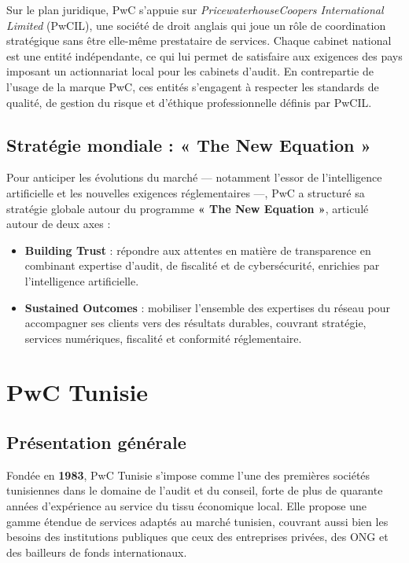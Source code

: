 Sur le plan juridique, PwC s'appuie sur \textit{PricewaterhouseCoopers International
Limited} (PwCIL), une société de droit anglais qui joue un rôle de coordination
stratégique sans être elle-même prestataire de services. Chaque cabinet national est
une entité indépendante, ce qui lui permet de satisfaire aux exigences des pays imposant
un actionnariat local pour les cabinets d'audit. En contrepartie de l'usage de la marque
PwC, ces entités s'engagent à respecter les standards de qualité, de gestion du risque
et d'éthique professionnelle définis par PwCIL.

\subsection{Stratégie mondiale : « The New Equation »}

Pour anticiper les évolutions du marché --- notamment l'essor de l'intelligence
artificielle et les nouvelles exigences réglementaires ---, PwC a structuré sa stratégie
globale autour du programme \textbf{« The New Equation »}, articulé autour de deux axes :

\begin{itemize}
  \item \textbf{Building Trust} : répondre aux attentes en matière de transparence en
    combinant expertise d'audit, de fiscalité et de cybersécurité, enrichies par
    l'intelligence artificielle.
  \item \textbf{Sustained Outcomes} : mobiliser l'ensemble des expertises du réseau pour
    accompagner ses clients vers des résultats durables, couvrant stratégie, services
    numériques, fiscalité et conformité réglementaire.
\end{itemize}

\section{PwC Tunisie}

\subsection{Présentation générale}

Fondée en \textbf{1983}, PwC Tunisie s'impose comme l'une des premières sociétés
tunisiennes dans le domaine de l'audit et du conseil, forte de plus de quarante années
d'expérience au service du tissu économique local. Elle propose une gamme étendue de
services adaptés au marché tunisien, couvrant aussi bien les besoins des institutions
publiques que ceux des entreprises privées, des ONG et des bailleurs de fonds
internationaux.

